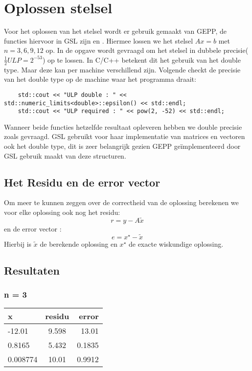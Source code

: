 \documentclass[10pt,a4paper,twocolumn]{article}
\begin{document}
\section{Oplossen stelsel}
Voor het oplossen van het stelsel wordt er gebruik gemaakt van GEPP, de functies hiervoor in GSL zijn \texttt{} en \texttt{}. Hiermee lossen we het stelsel $Ax = b$ met $n = 3,6,9,12$ op.
\newline
\newline
In de opgave wordt gevraagd om het stelsel in dubbele precisie($\frac{1}{2}ULP = 2^{-53}$) op te lossen. In C/C++ betekent dit het gebruik van het double type. Maar deze kan per machine verschillend zijn. Volgende checkt de precisie van het double type op de machine waar het programma draait:
\begin{lstlisting}
    std::cout << "ULP double : " << std::numeric_limits<double>::epsilon() << std::endl;
    std::cout << "ULP required : " << pow(2, -52) << std::endl;
\end{lstlisting}
Wanneer beide functies hetzelfde resultaat opleveren hebben we double precisie zoals gevraagd.
\newline
\newline
GSL gebruikt voor haar implementatie van matrices en vectoren ook het double type, dit is zeer belangrijk gezien GEPP geïmplementeerd door GSL gebruik maakt van deze structuren.
\subsection{Het Residu en de error vector}
Om meer te kunnen zeggen over de correctheid van de oplossing berekenen we voor elke oplossing ook nog het residu:
$$r = y - A\tilde{x}$$
en de error vector : 
$$e = x^{\star} - \tilde{x}$$
Hierbij is $\tilde{x}$ de berekende oplossing en $x^{\star}$ de exacte wiskundige oplossing.
\subsection{Resultaten}
\subsubsection{n = 3}
 \begin{tabular}{ l | c | r }
   \textbf{x} & \textbf{residu} & \textbf{error} \\ \hline
   -12.01 & 9.598 & 13.01 \\
   0.8165 & 5.432 & 0.1835 \\
   0.008774 & 10.01 & 0.9912 \\
\end{tabular}
\end{document}
